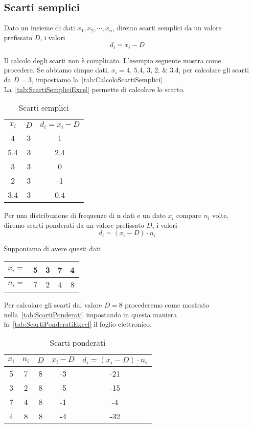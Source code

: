 \subsection{Scarti semplici}
\begin{defn}
Dato un insieme di dati  $x_{1},x_{2},\cdots,x_{n}$, diremo scarti semplici da un valore prefissato $D$,  i valori \[d_{i}=x_{i}-D \]
\end{defn}
Il calcolo degli scarti non è complicato. L'esempio seguente mostra come procedere. Se abbiamo cinque dati, $x_{i}=\numlist{4;5.4;3;2;3.4}$, per calcolare gli scarti da $D=3$, impostiamo  la~\vref{tab:CalcoloScartiSemplici}. La~\vref{tab:ScartiSempliciExcel} permette di calcolare lo scarto. 
\begin{table}
	\centering
	\begin{tabular}{S[table-format=1.1]S[table-format=1.0]S[table-format=1.1]}
		\toprule
		{$x_{i}$}& {$D$} &{$d_{i}=x_{i}-D$}  \\ 
		&  3& 1 \\ 
		5.4& 3 &2.4  \\ 
		3&  3& 0 \\ 
		2&  3& -1 \\ 
		3.4&3 &0.4\\
		\bottomrule
	\end{tabular} 
	\caption{Scarti semplici}
	\label{tab:CalcoloScartiSemplici}
\end{table}
\begin{defn}
Per una distribuzione di frequenze di n dati e un dato $x_{i}$ compare $n_{i}$ volte,  diremo scarti ponderati da un valore prefissato $D$,  i valori \[d_{i}=(x_{i}-D)\cdot n_{i} \]
\end{defn}
Supponiamo di avere questi dati 
\begin{center}
	\begin{tabular}{l*{4} {S[table-format=1.0]}}
		{$x_{i}=$}	&5  &3  &7  &4  \\
		\midrule 
		{$n_{i}=$}	& 7 &2  & 4 & 8 \\ 
	\end{tabular}
\end{center}
Per calcolare gli  scarti dal valore $D=8$  procederemo come mostrato nella~\vref{tab:ScartiPonderati} impostando  in questa maniera la~\vref*{tab:ScartiPonderatiExcel} il foglio elettronico.
\begin{table}
	\centering
	\begin{tabular}{*{4} {S[table-format=1.0]}S[table-format=2.0]}
		\toprule
		{$x_{i}$} & {$n_{i}$ } & {$D$} & {$x_{i}-D $} & {$d_{i}=(x_{i}-D ) \cdot n_{i}$} \\ 
		& 7 &8  & -3 & -21 \\ 
		3&  2& 8 &  -5& -15 \\ 
		7&  4& 8 &  -1&  -4\\ 
		4&  8& 8 & -4 & -32 \\ 
		\bottomrule
	\end{tabular} 
	\caption{Scarti ponderati}
	\label{tab:ScartiPonderati}
\end{table}

